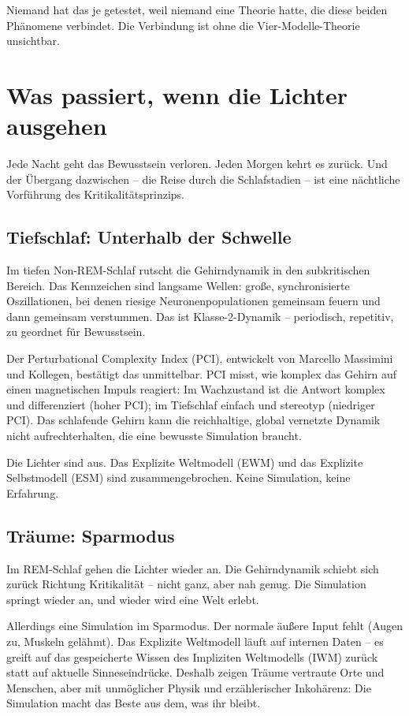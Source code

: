 \documentclass[11pt, twoside, openright]{book}
\begin{document}
Niemand hat das je getestet, weil niemand eine Theorie hatte, die diese beiden Phänomene verbindet. Die Verbindung ist ohne die Vier-Modelle-Theorie unsichtbar.

\chapter{Was passiert, wenn die Lichter ausgehen}

Jede Nacht geht das Bewusstsein verloren. Jeden Morgen kehrt es zurück. Und der Übergang dazwischen -- die Reise durch die Schlafstadien -- ist eine nächtliche Vorführung des Kritikalitätsprinzips.

\section*{Tiefschlaf: Unterhalb der Schwelle}

Im tiefen Non-REM-Schlaf rutscht die Gehirndynamik in den subkritischen Bereich. Das Kennzeichen sind langsame Wellen: große, synchronisierte Oszillationen, bei denen riesige Neuronenpopulationen gemeinsam feuern und dann gemeinsam verstummen. Das ist Klasse-2-Dynamik -- periodisch, repetitiv, zu geordnet für Bewusstsein.

Der Perturbational Complexity Index (PCI), entwickelt von Marcello Massimini und Kollegen, bestätigt das unmittelbar. PCI misst, wie komplex das Gehirn auf einen magnetischen Impuls reagiert: Im Wachzustand ist die Antwort komplex und differenziert (hoher PCI); im Tiefschlaf einfach und stereotyp (niedriger PCI). Das schlafende Gehirn kann die reichhaltige, global vernetzte Dynamik nicht aufrechterhalten, die eine bewusste Simulation braucht.

Die Lichter sind aus. Das Explizite Weltmodell (EWM) und das Explizite Selbstmodell (ESM) sind zusammengebrochen. Keine Simulation, keine Erfahrung.

\section*{Träume: Sparmodus}

Im REM-Schlaf gehen die Lichter wieder an. Die Gehirndynamik schiebt sich zurück Richtung Kritikalität -- nicht ganz, aber nah genug. Die Simulation springt wieder an, und wieder wird eine Welt erlebt.

Allerdings eine Simulation im Sparmodus. Der normale äußere Input fehlt (Augen zu, Muskeln gelähmt). Das Explizite Weltmodell läuft auf internen Daten -- es greift auf das gespeicherte Wissen des Impliziten Weltmodells (IWM) zurück statt auf aktuelle Sinneseindrücke. Deshalb zeigen Träume vertraute Orte und Menschen, aber mit unmöglicher Physik und erzählerischer Inkohärenz: Die Simulation macht das Beste aus dem, was ihr bleibt.
\end{document}
